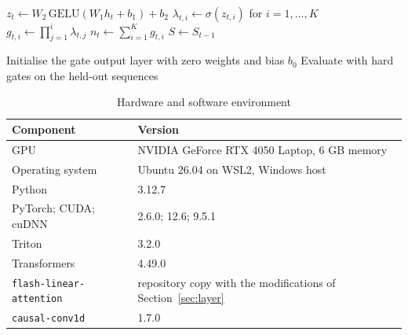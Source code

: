 \begin{algorithm}[ht]
\caption{Forward pass of the adaptive-order layer for one token}
\label{alg:forward}
$z_t \leftarrow W_2\,\mathrm{GELU}(W_1 h_t + b_1) + b_2$ 
$\lambda_{t,i} \leftarrow \sigma(z_{t,i})$ for $i = 1,\dots,K$ 
$g_{t,i} \leftarrow \prod_{j=1}^{i}\lambda_{t,j}$ 
$n_t \leftarrow \sum_{i=1}^{K} g_{t,i}$\;
$S \leftarrow S_{t-1}$\;
\;
\end{algorithm}

\begin{algorithm}[ht]
\caption{Training the adaptive-order layer with a compute budget}
\label{alg:train}
Initialise the gate output layer with zero weights and bias $b_0$\;
Evaluate with hard gates on the held-out sequences\;
\end{algorithm}

\begin{table}[ht]
	\caption{Hardware and software environment}
	\centering
	\begin{tabular}{p{5.0cm} p{8.2cm}}
		\toprule
		\textbf{Component} & \textbf{Version} \\
		\midrule
		GPU & NVIDIA GeForce RTX 4050 Laptop, 6 GB memory \\
		Operating system & Ubuntu 26.04 on WSL2, Windows host \\
		Python & 3.12.7 \\
		PyTorch; CUDA; cuDNN & 2.6.0; 12.6; 9.5.1 \\
		Triton & 3.2.0 \\
		Transformers & 4.49.0 \\
		\texttt{flash-linear-attention} & repository copy with the modifications of Section~\ref{sec:layer} \\
		\texttt{causal-conv1d} & 1.7.0 \\
		\bottomrule
	\end{tabular}
	\label{tab:env}
\end{table}
\FloatBarrier

